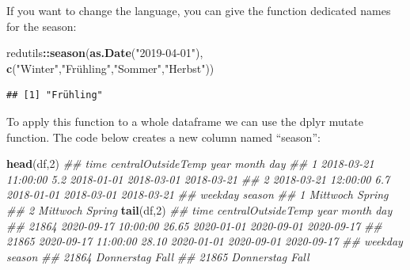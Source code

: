 \documentclass[
]{book}
\newenvironment{Shaded}{\begin{snugshade}}{\end{snugshade}}
\newcommand{\CommentTok}[1]{\textcolor[rgb]{0.56,0.35,0.01}{\textit{#1}}}
\newcommand{\DataTypeTok}[1]{\textcolor[rgb]{0.13,0.29,0.53}{#1}}
\newcommand{\DecValTok}[1]{\textcolor[rgb]{0.00,0.00,0.81}{#1}}
\newcommand{\KeywordTok}[1]{\textcolor[rgb]{0.13,0.29,0.53}{\textbf{#1}}}
\newcommand{\NormalTok}[1]{#1}
\newcommand{\OperatorTok}[1]{\textcolor[rgb]{0.81,0.36,0.00}{\textbf{#1}}}
\newcommand{\StringTok}[1]{\textcolor[rgb]{0.31,0.60,0.02}{#1}}
\begin{document}
If you want to change the language, you can give the function dedicated names for the season:

\begin{Shaded}
\begin{Highlighting}[]
\NormalTok{redutils}\OperatorTok{::}\KeywordTok{season}\NormalTok{(}\KeywordTok{as.Date}\NormalTok{(}\StringTok{"2019-04-01"}\NormalTok{), }\KeywordTok{c}\NormalTok{(}\StringTok{"Winter"}\NormalTok{,}\StringTok{"Frühling","}\NormalTok{Sommer}\StringTok{","}\NormalTok{Herbst}\StringTok{"))}
\end{Highlighting}
\end{Shaded}

\begin{verbatim}
## [1] "Frühling"
\end{verbatim}

To apply this function to a whole dataframe we can use the dplyr mutate function. The code below creates a new column named ``season'':

\begin{Shaded}
\end{Shaded}

\begin{Shaded}
\begin{Highlighting}[]
\KeywordTok{head}\NormalTok{(df,}\DecValTok{2}\NormalTok{)}
\CommentTok{##                  time centralOutsideTemp       year      month        day}
\CommentTok{## 1 2018-03-21 11:00:00                5.2 2018-01-01 2018-03-01 2018-03-21}
\CommentTok{## 2 2018-03-21 12:00:00                6.7 2018-01-01 2018-03-01 2018-03-21}
\CommentTok{##    weekday season}
\CommentTok{## 1 Mittwoch Spring}
\CommentTok{## 2 Mittwoch Spring}
\KeywordTok{tail}\NormalTok{(df,}\DecValTok{2}\NormalTok{)}
\CommentTok{##                      time centralOutsideTemp       year      month        day}
\CommentTok{## 21864 2020-09-17 10:00:00              26.65 2020-01-01 2020-09-01 2020-09-17}
\CommentTok{## 21865 2020-09-17 11:00:00              28.10 2020-01-01 2020-09-01 2020-09-17}
\CommentTok{##          weekday season}
\CommentTok{## 21864 Donnerstag   Fall}
\CommentTok{## 21865 Donnerstag   Fall}
\end{Highlighting}
\end{Shaded}
\end{document}
